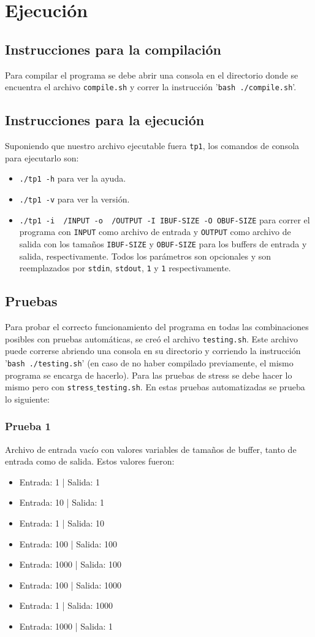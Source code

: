 \documentclass[a4paper, 10pt]{article}
\def\code#1{\texttt{#1}}
\begin{document}
	\section{Ejecución}
		\subsection{Instrucciones para la compilación}
			Para compilar el programa se debe abrir una consola en el directorio donde se encuentra el archivo
			\code{compile.sh} y correr la instrucción '\code{bash ./compile.sh}'.
		\subsection{Instrucciones para la ejecución}
			Suponiendo que nuestro archivo ejecutable fuera \code{tp1}, los comandos de consola para ejecutarlo
			son:
			\begin{itemize}
				\item \code{./tp1 -h} para ver la ayuda.
				\item \code{./tp1 -v} para ver la versión.
				\item \code{./tp1 -i ~/INPUT -o ~/OUTPUT -I IBUF-SIZE -O OBUF-SIZE} para correr el programa con \code{INPUT} 
				como archivo de entrada y \code{OUTPUT} como archivo de salida con los tamaños \code{IBUF-SIZE} y \code{OBUF-SIZE}
				para los buffers de entrada y salida, respectivamente. Todos los parámetros son opcionales y son reemplazados por 
				\code{stdin}, \code{stdout}, \code{1} y \code{1} respectivamente.
			\end{itemize}
		\subsection{Pruebas}
			Para probar el correcto funcionamiento del programa en todas las combinaciones posibles con pruebas automáticas, se 
			creó el archivo \code{testing.sh}. Este archivo puede correrse abriendo una consola en su directorio y corriendo la
			instrucción '\code{bash ./testing.sh}' (en caso de no haber compilado previamente, el mismo programa se encarga de
			hacerlo). Para las pruebas de stress se debe hacer lo mismo pero con \code{stress$\_$testing.sh}.
			En estas pruebas automatizadas se prueba lo siguiente:
			\subsubsection{Prueba 1}
				Archivo de entrada vacío con valores variables de tamaños de buffer, tanto de entrada como de salida. Estos valores
				fueron:
				\begin{itemize}
					\item Entrada: 1    | Salida: 1
					\item Entrada: 10   | Salida: 1
					\item Entrada: 1    | Salida: 10
					\item Entrada: 100  | Salida: 100
					\item Entrada: 1000 | Salida: 100
					\item Entrada: 100  | Salida: 1000
					\item Entrada: 1    | Salida: 1000
					\item Entrada: 1000 | Salida: 1
				\end{itemize}
\end{document}
